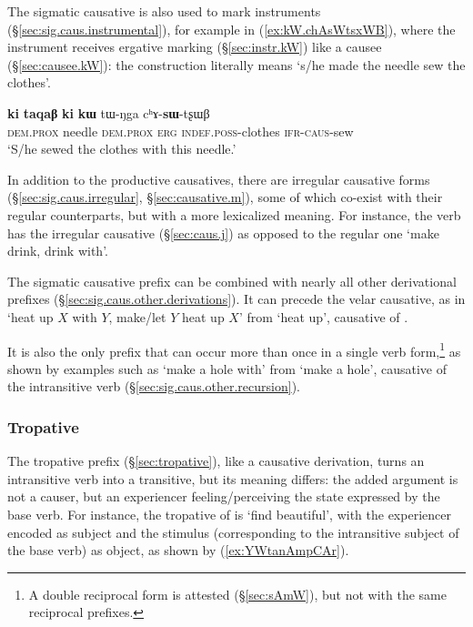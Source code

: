 The sigmatic causative is also used to mark instruments (§\ref{sec:sig.caus.instrumental}), for example in (\ref{ex:kW.chAsWtsxWB}), where the instrument  receives  ergative marking (§\ref{sec:instr.kW}) like a causee (§\ref{sec:causee.kW}): the construction literally means `s/he made the needle sew the clothes'.

\begin{exe}
\ex  \label{ex:kW.chAsWtsxWB}
\gll  \textbf{ki} \textbf{taqaβ} \textbf{ki} \textbf{kɯ} tɯ-ŋga cʰɤ-\textbf{sɯ}-tʂɯβ  \\
 \textsc{dem}.\textsc{prox} needle \textsc{dem}.\textsc{prox} \textsc{erg} \textsc{indef}.\textsc{poss}-clothes \textsc{ifr}-\textsc{caus}-sew \\
\glt `S/he sewed the clothes with this needle.' 
\end{exe}

In addition to the productive causatives, there are irregular causative forms (§\ref{sec:sig.caus.irregular}, §\ref{sec:causative.m}), some of which co-exist with their regular counterparts, but with a more lexicalized meaning. For instance, the verb  has the irregular causative  (§\ref{sec:caus.j}) as opposed to the regular one  `make drink, drink with'.

The sigmatic causative prefix can be combined with nearly all other derivational prefixes (§\ref{sec:sig.caus.other.derivations}). It can precede the velar causative, as in  `heat up $X$ with $Y$, make/let $Y$ heat up $X$' from  `heat up', causative of . 

It is also the only prefix that can occur more than once in a single verb form,\footnote{A double reciprocal form is attested (§\ref{sec:sAmW}), but not with the same reciprocal prefixes. } as shown by examples such as  `make a hole with' from  `make a hole', causative of the intransitive verb  (§\ref{sec:sig.caus.other.recursion}). 


\subsubsection{Tropative}
The tropative  prefix (§\ref{sec:tropative}), like a causative derivation, turns an intransitive verb into a transitive, but its meaning differs: the added argument is not a causer, but an experiencer feeling/perceiving the state expressed by the base verb. For instance, the tropative of  is  `find beautiful', with the experiencer encoded as subject and the stimulus (corresponding to the intransitive subject of the base verb) as object, as shown by (\ref{ex:YWtanAmpCAr}).

